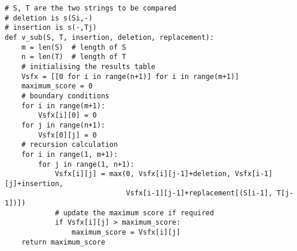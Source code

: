 \lstset{basicstyle=\footnotesize,style=myCustomMatlabStyle}
\begin{lstlisting}
# S, T are the two strings to be compared
# deletion is s(Si,-)
# insertion is s(-,Tj)
def v_sub(S, T, insertion, deletion, replacement):
    m = len(S)  # length of S
    n = len(T)  # length of T
    # initialising the results table
    Vsfx = [[0 for i in range(n+1)] for i in range(m+1)]
    maximum_score = 0
    # boundary conditions
    for i in range(m+1):
        Vsfx[i][0] = 0
    for j in range(n+1):
        Vsfx[0][j] = 0
    # recursion calculation
    for i in range(1, m+1):
        for j in range(1, n+1):
            Vsfx[i][j] = max(0, Vsfx[i][j-1]+deletion, Vsfx[i-1][j]+insertion,
                             Vsfx[i-1][j-1]+replacement[(S[i-1], T[j-1])])
            # update the maximum score if required
            if Vsfx[i][j] > maximum_score:
                maximum_score = Vsfx[i][j]
    return maximum_score

\end{lstlisting}